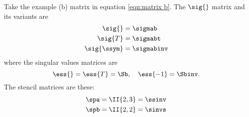 Take the example (b) matrix in equation \eqref{eqn:matrix b}. The $\sig{}$ matrix and its variants are
\begin{equation}
  \begin{split}
    \sig{}   &= \sigmab \\
    \sig{T}  &= \sigmabt \\
    \sig{\ssym} &= \sigmabinv
  \end{split}
\end{equation}
where the singular values matrices are
\begin{equation}
    \ess{} = \ess{T} = \Sb, \quad \ess{-1} = \Sbinv .
\end{equation}
The stencil matrices are these:
\begin{equation}
  \begin{split}
    \spa &= \II{2,3} = \ssinv \\
    \spb &= \II{2,2} = \sinvs
  \end{split}
\end{equation}

